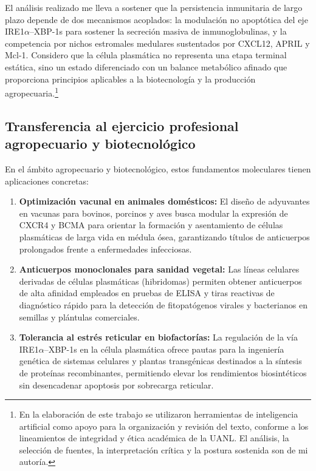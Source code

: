 El análisis realizado me lleva a sostener que la persistencia inmunitaria de largo plazo depende de dos mecanismos acoplados: la modulación no apoptótica del eje IRE1$\alpha$--XBP-1s para sostener la secreción masiva de inmunoglobulinas, y la competencia por nichos estromales medulares sustentados por CXCL12, APRIL y Mcl-1. Considero que la célula plasmática no representa una etapa terminal estática, sino un estado diferenciado con un balance metabólico afinado que proporciona principios aplicables a la biotecnología y la producción agropecuaria.\footnote{En la elaboración de este trabajo se utilizaron herramientas de inteligencia artificial como apoyo para la organización y revisión del texto, conforme a los lineamientos de integridad y ética académica de la UANL. El análisis, la selección de fuentes, la interpretación crítica y la postura sostenida son de mi autoría.}

\subsection{Transferencia al ejercicio profesional agropecuario y biotecnológico}
En el ámbito agropecuario y biotecnológico, estos fundamentos moleculares tienen aplicaciones concretas:
\begin{enumerate}
	\item \textbf{Optimización vacunal en animales domésticos:} El diseño de adyuvantes en vacunas para bovinos, porcinos y aves busca modular la expresión de CXCR4 y BCMA para orientar la formación y asentamiento de células plasmáticas de larga vida en médula ósea, garantizando títulos de anticuerpos prolongados frente a enfermedades infecciosas.
	\item \textbf{Anticuerpos monoclonales para sanidad vegetal:} Las líneas celulares derivadas de células plasmáticas (hibridomas) permiten obtener anticuerpos de alta afinidad empleados en pruebas de ELISA y tiras reactivas de diagnóstico rápido para la detección de fitopatógenos virales y bacterianos en semillas y plántulas comerciales.
	\item \textbf{Tolerancia al estrés reticular en biofactorías:} La regulación de la vía IRE1$\alpha$--XBP-1s en la célula plasmática ofrece pautas para la ingeniería genética de sistemas celulares y plantas transgénicas destinados a la síntesis de proteínas recombinantes, permitiendo elevar los rendimientos biosintéticos sin desencadenar apoptosis por sobrecarga reticular.
\end{enumerate}
